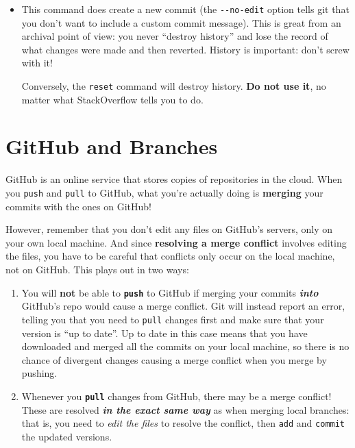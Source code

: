 \documentclass[]{book}
\theoremstyle{definition}
\theoremstyle{definition}
\theoremstyle{remark}
\begin{document}
\begin{itemize}
\item
  This command does create a new commit (the \texttt{-\/-no-edit} option
  tells git that you don't want to include a custom commit message).
  This is great from an archival point of view: you never ``destroy
  history'' and lose the record of what changes were made and then
  reverted. History is important: don't screw with it!

  Conversely, the \texttt{reset} command will destroy history.
  \textbf{Do not use it}, no matter what StackOverflow tells you to do.
\end{itemize}

\section{GitHub and Branches}\label{github-and-branches}

GitHub is an online service that stores copies of repositories in the
cloud. When you \texttt{push} and \texttt{pull} to GitHub, what you're
actually doing is \textbf{merging} your commits with the ones on GitHub!

However, remember that you don't edit any files on GitHub's servers,
only on your own local machine. And since \textbf{resolving a merge
conflict} involves editing the files, you have to be careful that
conflicts only occur on the local machine, not on GitHub. This plays out
in two ways:

\begin{enumerate}
\def\labelenumi{\arabic{enumi}.}
\item
  You will \textbf{not} be able to \textbf{\texttt{push}} to GitHub if
  merging your commits \textbf{\emph{into}} GitHub's repo would cause a
  merge conflict. Git will instead report an error, telling you that you
  need to \texttt{pull} changes first and make sure that your version is
  ``up to date''. Up to date in this case means that you have downloaded
  and merged all the commits on your local machine, so there is no
  chance of divergent changes causing a merge conflict when you merge by
  pushing.
\item
  Whenever you \textbf{\texttt{pull}} changes from GitHub, there may be
  a merge conflict! These are resolved \textbf{\emph{in the exact same
  way}} as when merging local branches: that is, you need to \emph{edit
  the files} to resolve the conflict, then \texttt{add} and
  \texttt{commit} the updated versions.
\end{enumerate}
\end{document}
